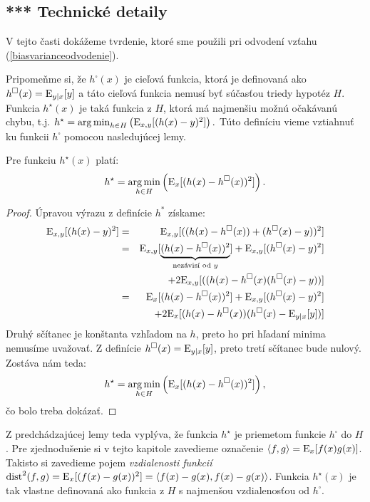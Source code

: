 \subsection{*** Technické detaily}
\label{tradeoff:tech}

\def\dist{\text{dist}}

V tejto časti dokážeme tvrdenie, ktoré sme použili pri odvodení vzťahu
(\ref{biasvarianceodvodenie}).

Pripomeňme si, že $h^{\square}(x)$ je cieľová funkcia, ktorá je
definovaná ako $h^{\square}(x)=\mathrm{E}_{y|x}[y]$ a táto cieľová funkcia
nemusí byť súčasťou triedy hypotéz $H$.
Funkcia $h^\star(x)$ je taká funkcia z $H$, ktorá má najmenšiu možnú
očakávanú chybu, t.j. $h^\star = \operatorname*{{arg\,min}}_{h\in H} \left(
\mathrm{E}_{x,y}[(h(x)-y)^2] \right).$ Túto definíciu vieme vztiahnuť ku funkcii
$h^\square$ pomocou nasledujúcej lemy.

\begin{lemma}
  Pre funkciu $h^\star(x)$ platí:
  $$h^\star=\operatorname*{{arg\,min}}_{h\in H} \left(\mathrm{E}_{x}[(h(x)-h^\square(x))^2] \right).$$
\label{lemaprojekcia}
\end{lemma}

\begin{proof}
Úpravou výrazu z definície $h^*$ získame:
\begin{eqnarray*}
  \mathrm{E}_{x,y}[(h(x)-y)^2] & = & \mathrm{E}_{x,y}[((h(x)-h^{\square}(x))+(h^{\square}(x)-y))^2]\\
  & = & \mathrm{E}_{x,y}[\underbrace{(h(x)-h^{\square}(x))^2}_{\text{nezávisí od $y$}}] + \mathrm{E}_{x,y}[(h^{\square}(x)-y)^2]\\ && + 2\mathrm{E}_{x,y}[((h(x)-h^{\square}(x)(h^{\square}(x)-y))]\\
    & = & \mathrm{E}_x[(h(x)-h^{\square}(x))^2] + \mathrm{E}_{x,y}[(h^{\square}(x)-y)^2]\\&&+ 2\mathrm{E}_x[(h(x)-h^{\square}(x))(h^{\square}(x)-\mathrm{E}_{y|x}[y])]
\end{eqnarray*}
Druhý sčítanec je konštanta vzhľadom na $h$, preto ho pri hľadaní
minima nemusíme uvažovať. Z definície $h^{\square}(x)=\mathrm{E}_{y|x}[y]$, preto tretí
sčítanec bude nulový. Zostáva nám teda:
$$h^\star=\operatorname*{{arg\,min}}_{h\in H} \left(\mathrm{E}_{x}[(h(x)-h^\square(x))^2] \right),$$
čo bolo treba dokázať.
\end{proof}

\noindent
Z predchádzajúcej lemy teda vyplýva, že funkcia $h^\star$ je priemetom
funkcie $h^\square$ do $H$.
Pre zjednodušenie si v tejto kapitole
zavedieme označenie $\langle f,g \rangle = \mathrm{E}_x[f(x)g(x)]$.  Takisto
si zavedieme pojem \emph{vzdialenosti funkcií}
$\dist^2(f,g)=\E_x[(f(x)-g(x))^2]=\langle f(x)-g(x),f(x)-g(x)
\rangle$.  Funkcia $h^{\star}(x)$ je tak vlastne definovaná ako
funkcia z $H$ s najmenšou vzdialenosťou od $h^\square$.

